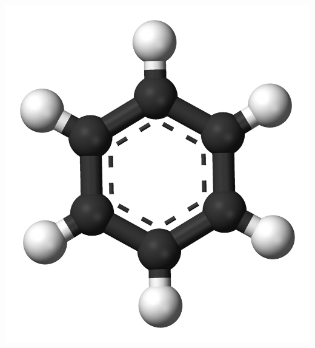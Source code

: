\begin{frame}
\begin{columns}
\begin{column}[b]{0.30\linewidth}
        \includegraphics[scale=0.1, clip, viewport = 0 0 1000 1200]{figures/benzene.png}

        \vspace{5mm}

    \end{column}
    \end{columns}
\end{frame}

